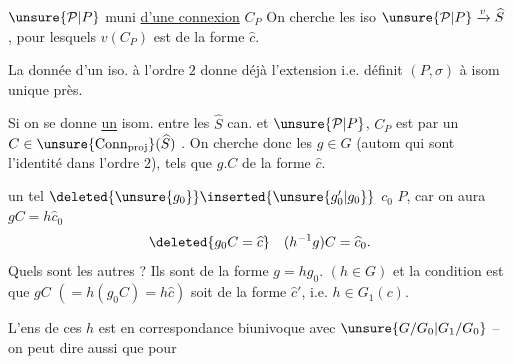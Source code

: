 $\unsure{\mathcal P|P}$ muni \uline{d'une connexion} $C_P$
On cherche les iso  $\unsure{\mathcal P|P}\xrightarrow{v}\widehat S$ , pour lesquels $v(C_P)$ est de la forme $\widehat c$.

La donnée d'un iso. à l'ordre $2$ donne déjà l'extension
i.e. définit $(P,\sigma)$ à isom unique près.

Si on se donne \uline{un} isom. entre les $\widehat S$ can. et $\unsure{\mathcal P|P}$, $C_P$ est  par un $C\in\unsure{\operatorname{Conn}_{\mathrm{proj}}}(\widehat S)$ . On cherche donc les $g\in G$ (autom  qui sont l'identité dans l'ordre $2$), tels que $g.C$ de la forme $\widehat c$.

   un tel $\deleted{\unsure{g_0}}\inserted{\unsure{g'_0|g_0}}$    $c_0$  $P$, car on aura $gC=h\widehat c_0$
\[
\deleted{g_0C=\widehat c}\quad (h^{-1}g)C=\widehat c_0.
\]
Quels sont les autres ? Ils sont de la forme $g=hg_0$. $(h\in G)$ et la condition est que $gC$ $(=h(g_0C)=h\widehat c)$ soit de la forme $\widehat c'$, i.e. $h\in G_1(c)$.

L'ens de ces $h$ est en correspondance biunivoque avec $\unsure{G/G_0|G_1/G_0}$ -- on peut dire aussi que pour 
